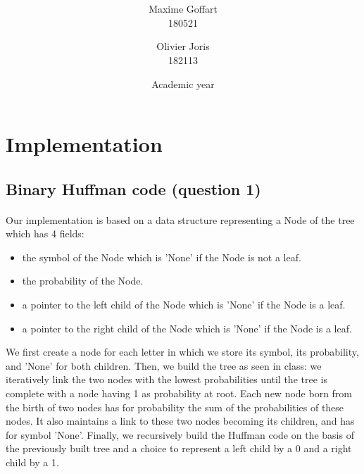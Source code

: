 \documentclass[a4paper, 11pt, oneside]{article}
\title{\ClassName\\\vspace*{0.8cm}\ProjectName\vspace{1cm}}
\author{Maxime Goffart \\180521 \and Olivier Joris\\182113}
\date{\vspace{1cm}Academic year \AcademicYear}
\begin{document}
\begin{titlingpage}
{\let\newpage\relax\maketitle}
\end{titlingpage}

\thispagestyle{empty}
\newpage




\section{Implementation}

\subsection{Binary Huffman code (question 1)}
\paragraph{}Our implementation is based on a data structure representing a Node of the tree which has 4 fields: 
\begin{itemize}
\item the symbol of the Node which is 'None' if the Node is not a leaf.
\item the probability of the Node.
\item a pointer to the left child of the Node which is 'None' if the Node is a leaf.
\item a pointer to the right child of the Node which is 'None' if the Node is a leaf.
\end{itemize}

We first create a node for each letter in which we store its symbol, its probability, and 'None' for both children.
Then, we build the tree as seen in class: we iteratively link the two nodes with the lowest probabilities until the tree is complete with a node having 1 as probability at root. Each new node born from the birth of two nodes has for probability the sum of the probabilities of these nodes. It also maintains a link to these two nodes becoming its children, and has for symbol 'None'.
Finally, we recursively build the Huffman code on the basis of the previously built tree and a choice to represent a left child by a 0 and a right child by a 1.
\end{document}
